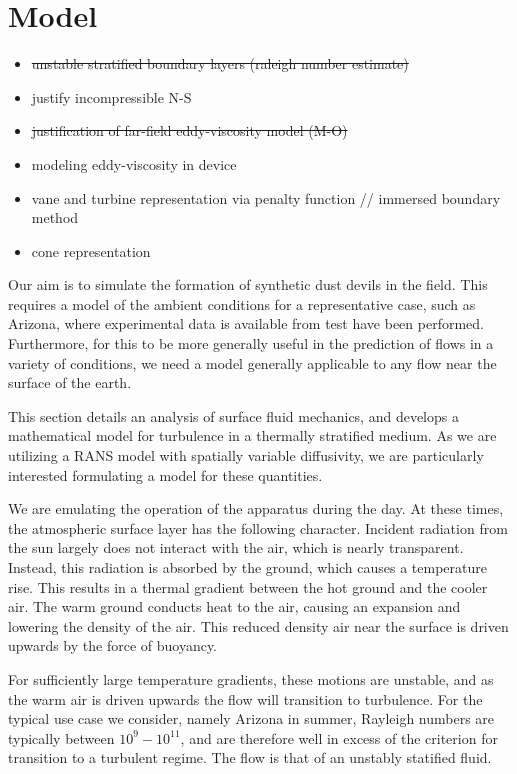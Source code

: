 \section{Model}

\begin{itemize}
\item \st{unstable stratified boundary layers (raleigh number estimate)}
\item justify incompressible N-S
\item \st{justification of far-field eddy-viscosity model (M-O)}
\item modeling eddy-viscosity in device 
\item vane and turbine representation via penalty function // immersed boundary method
\item cone representation
\end{itemize}

%
%

Our aim is to simulate the formation of synthetic dust devils in the
field. This requires a model of the ambient conditions for a
representative case, such as Arizona, where experimental data is
available from test have been performed. Furthermore, for this to be
more generally useful in the prediction of flows in a variety of
conditions, we need a model generally applicable to any flow near the
surface of the earth.  

This section details an analysis of surface fluid mechanics, and
develops a mathematical model for turbulence in a thermally stratified
medium. 
As we are utilizing a RANS model with spatially variable
diffusivity, we are particularly interested formulating a model for
these quantities. 

We are emulating the operation of the apparatus during the day. 
At these times, the atmospheric surface layer has the following character. 
Incident radiation from the sun largely does not interact with the
air, which is nearly transparent. Instead, this radiation is absorbed by
the ground, which causes a temperature rise. This results in a thermal
gradient between the hot ground and the cooler air. The warm ground
conducts heat to the air, causing an expansion and lowering the density
of the air. This reduced density air near the surface is driven upwards
by the force of buoyancy.  

For sufficiently large temperature gradients, these motions are
unstable, and as the warm air is driven upwards the flow will transition
to turbulence. For the typical use case we consider, namely Arizona in summer, 
Rayleigh numbers are typically between $10^{9} - 10^{11}$, and are therefore 
well in excess of the criterion for transition to a turbulent regime. The 
flow is that of an unstably statified fluid. 

